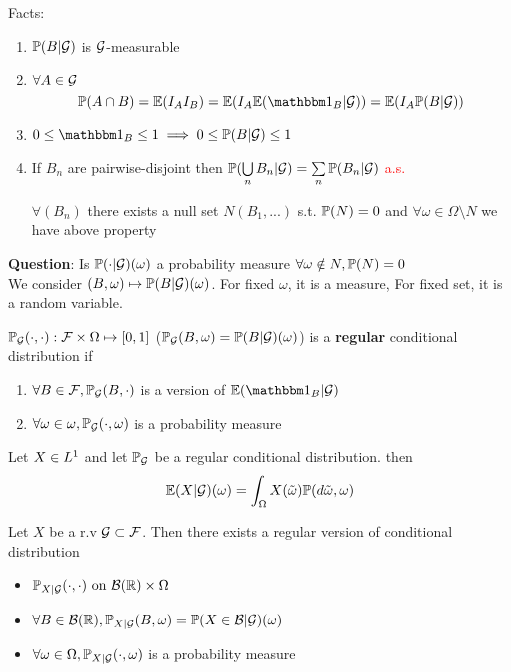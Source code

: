 Facts:
\begin{enumerate}
    \item $\mathbb{P}(B|\mathcal{G})$ is $\mathcal{G}$-measurable
    \item $\forall A\in \mathcal{G}$ 
    \begin{equation*}
        \prob(A\cap B) = \E(I_A I_B) = \E(I_A \E(\I_B|\setg)) =  \E(I_A \prob(B|\setg))
    \end{equation*}
    \item $0\leq \I_B\leq 1 \implies 0\leq \prob(B|\setg)\leq 1$
    \item If $B_n$ are pairwise-disjoint then $\mathbb{P}(\bigcup\limits_{n}B_n|\mathcal{G}) = \sum\limits_{n}\mathbb{P}(B_n|\mathcal{G})$ \textcolor{red}{a.s.}
    \begin{rem}
    $\forall (B_n)$  there exists a null set $N(B_1, ...)$ s.t. $\mathbb{P}(N) = 0$ and $\forall \omega \in \Omega\setminus N$ we have above property
\end{rem}
\end{enumerate}
\newpage 
\textbf{Question}: Is $\mathbb{P}(\cdot | \mathcal{G})(\omega)$ a probability measure $\forall \omega \notin N, \mathbb{P}(N) =0$\\
We consider $(B, \omega)\mapsto \mathbb{P}(B|\mathcal{G})(\omega)$. For fixed $\omega$, it is a measure, For fixed set, it is a random variable.
\begin{dfn}
$\mathbb{P}_{\mathcal{G}}(\cdot,\cdot): \mathcal{F} \times \Omega \mapsto [0,1]$ ($\mathbb{P}_{\mathcal{G}}(B,\omega) = \mathbb{P}(B|\mathcal{G})(\omega) $) is a \textbf{regular} conditional distribution if 
\begin{enumerate}
    \item $\forall B\in\mathcal{F}, \mathbb{P}_{\mathcal{G}}(B,\cdot)$ is a version of $\E(\I_B|\setg)$
    \item $\forall \omega\in\omega, \mathbb{P}_{\mathcal{G}}(\cdot,\omega)$ is a probability measure
\end{enumerate}
\end{dfn}
\begin{thm}
Let $X\in L^{1}$ and let $\mathbb{P}_{\mathcal{G}}$ be a regular conditional distribution. then 
\begin{equation*}
    \mathbb{E}(X|\mathcal{G})(\omega) = \int_{\Omega} X(\tilde{\omega}) \mathbb{P}(\mathop{}\!d\tilde{\omega}, \omega)
\end{equation*}
\end{thm}
\begin{thm}
Let $X$ be a r.v $\mathcal{G}\subset\mathcal{F}$. Then there exists a regular version of conditional distribution 

\begin{itemize}
    \item $\mathbb{P}_{X|\mathcal{G}}(\cdot,\cdot) \text{ on } \mathcal{B}(\mathbb{R})\times \Omega$
    \item $\forall B\in\mathcal{B}(\mathbb{R}), \mathbb{P}_{X|\mathcal{G}}(B,\omega) = \mathbb{P}(X\in\mathcal{B}|\mathcal{G})(\omega)$
    \item $\forall \omega\in\Omega, \mathbb{P}_{X|\mathcal{G}}(\cdot,\omega)$ is a probability measure
\end{itemize}
\end{thm}
